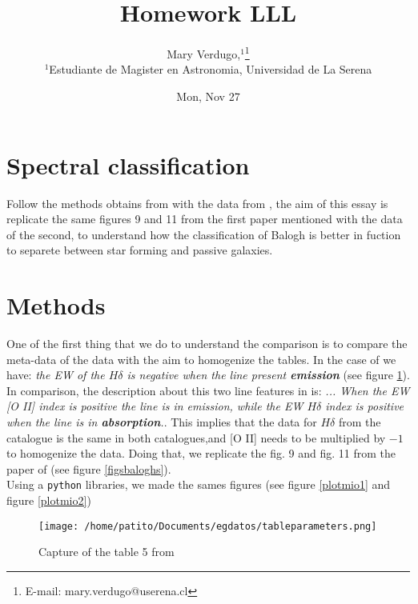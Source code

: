 \documentclass[fleqn,usenatbib]{mnras}
\title[1 homework LLL]{Homework LLL}
\author[Mary Verdugo]{
Mary Verdugo,$^{1}$\thanks{E-mail: mary.verdugo@userena.cl}
\\
$^{1}$Estudiante de Magister en Astronomia, Universidad de La Serena\\
}
\date{Mon, Nov 27}
\begin{document}
\label{firstpage}
\pagerange{\pageref{firstpage}--\pageref{lastpage}}
\maketitle







\section{Spectral classification}

Follow the methods obtains from \citet[]{Balogh} with the data from
\citet[]{Dressler}, the aim of this essay is replicate the same figures
9 and 11 from the first paper mentioned with the data of the second, to understand how the classification of Balogh is better in fuction to separete between star forming and passive galaxies.
\\

\section{Methods}
One of the first thing that we do to understand the comparison is to compare the meta-data of the data with the aim to homogenize the tables. In the case of \citet{Dressler} we have: \textit{the EW of the $H\delta$  is negative when the line present \textbf{emission}} (see figure \ref{dresslertable}). In comparison, the description about this two line features in \citet{Balogh} is: \textit{... When the EW [O II] index is positive the line is in emission, while the EW $H\delta$ index is positive when the line is in \textbf{absorption}.}. This implies that the data for $H\delta$ from the \citet{Dressler} catalogue is the same in both catalogues,and [O II] needs to be multiplied by $-1$ to homogenize the data. Doing that, we replicate the fig. 9 and fig. 11 from the paper of \citet{Balogh} (see figure \ref{figsbaloghs}).
\\

Using a \texttt{python} libraries, we made the sames figures (see figure \ref{plotmio1} and figure \ref{plotmio2})

\begin{figure}
	\texttt{[image: /home/patito/Documents/egdatos/tableparameters.png]}
    \caption{Capture of the table 5 from \citet{Dressler}}
    \label{dresslertable}
\end{figure}
\end{document}
